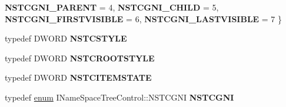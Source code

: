 \begin{DoxyCompactItemize}
\newline
{\bfseries N\+S\+T\+C\+G\+N\+I\+\_\+\+P\+A\+R\+E\+NT} = 4, 
{\bfseries N\+S\+T\+C\+G\+N\+I\+\_\+\+C\+H\+I\+LD} = 5, 
{\bfseries N\+S\+T\+C\+G\+N\+I\+\_\+\+F\+I\+R\+S\+T\+V\+I\+S\+I\+B\+LE} = 6, 
{\bfseries N\+S\+T\+C\+G\+N\+I\+\_\+\+L\+A\+S\+T\+V\+I\+S\+I\+B\+LE} = 7
 \}
\item 
\mbox{\label{interface_i_name_space_tree_control_adff14f875d216dedac4f1c7f6c5f078e}} 
typedef D\+W\+O\+RD {\bfseries N\+S\+T\+C\+S\+T\+Y\+LE}
\item 
\mbox{\label{interface_i_name_space_tree_control_acced57b285f28a3721b71c474ef94b50}} 
typedef D\+W\+O\+RD {\bfseries N\+S\+T\+C\+R\+O\+O\+T\+S\+T\+Y\+LE}
\item 
\mbox{\label{interface_i_name_space_tree_control_ad4f7a620bfa4cb93af4251f2fe4d6d5b}} 
typedef D\+W\+O\+RD {\bfseries N\+S\+T\+C\+I\+T\+E\+M\+S\+T\+A\+TE}
\item 
\mbox{\label{interface_i_name_space_tree_control_a7542329e180f982456b10a46662aa78d}} 
typedef \hyperlink{interfaceenum}{enum} I\+Name\+Space\+Tree\+Control\+::\+N\+S\+T\+C\+G\+NI {\bfseries N\+S\+T\+C\+G\+NI}
\end{DoxyCompactItemize}
